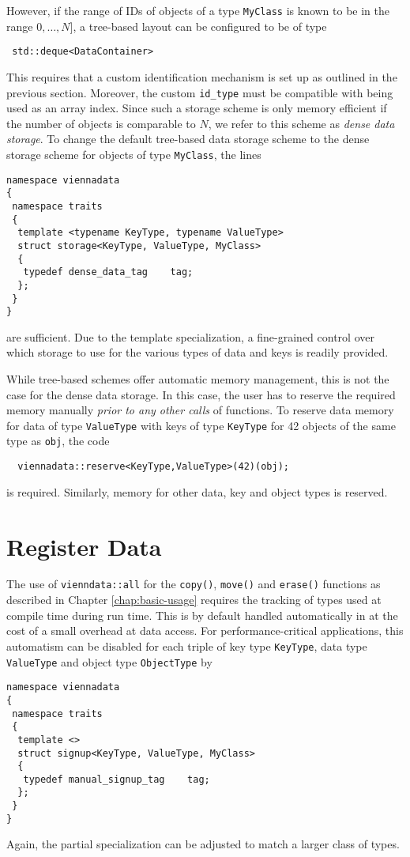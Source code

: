 However, if the range of IDs of objects of a type \lstinline|MyClass| is known to be in the range $0, \ldots, N]$,
a tree-based layout can be configured to be of type
\begin{lstlisting}
 std::deque<DataContainer>
\end{lstlisting}
This requires that a custom identification mechanism is set up as outlined in the previous section. Moreover, the 
custom \lstinline|id_type| must be compatible with being used as an array index. Since such a storage scheme is only memory efficient
if the number of objects is comparable to $N$, we refer to this scheme as \emph{dense data storage}.
To change the default tree-based data storage scheme to the dense storage scheme for objects of type \lstinline|MyClass|, the lines
\begin{lstlisting}
namespace viennadata
{
 namespace traits
 {
  template <typename KeyType, typename ValueType>
  struct storage<KeyType, ValueType, MyClass>
  {
   typedef dense_data_tag    tag;
  };
 }
}
\end{lstlisting}
are sufficient. Due to the template specialization, a fine-grained control over which storage to use for the various types of data and keys is readily provided.

While tree-based schemes offer automatic memory management, this is not the case for the dense data storage. In this case, 
the user has to reserve the required memory manually \emph{prior to any other calls} of {\ViennaData} functions.
To reserve data memory for data of type \lstinline|ValueType| with keys of type \lstinline|KeyType| for 42 objects of the same type as \lstinline|obj|,
the code
\begin{lstlisting}
  viennadata::reserve<KeyType,ValueType>(42)(obj);
\end{lstlisting}
is required. Similarly, memory for other data, key and object types is reserved.


\section{Register Data} \label{sec:register-data}
The use of \lstinline|vienndata::all| for the \lstinline|copy()|, \lstinline|move()| and \lstinline|erase()| functions as described in Chapter \ref{chap:basic-usage}
requires the tracking of types used at compile time during run time. This is by default handled automatically in {\ViennaData} at the cost of a small overhead at data access.
For performance-critical applications, this automatism can be disabled for each triple of key type \lstinline|KeyType|, data type \lstinline|ValueType| and object type \lstinline|ObjectType| by
\begin{lstlisting}
namespace viennadata
{
 namespace traits
 {
  template <>
  struct signup<KeyType, ValueType, MyClass>
  {
   typedef manual_signup_tag    tag;
  };
 }
}
\end{lstlisting}
Again, the partial specialization can be adjusted to match a larger class of types.

